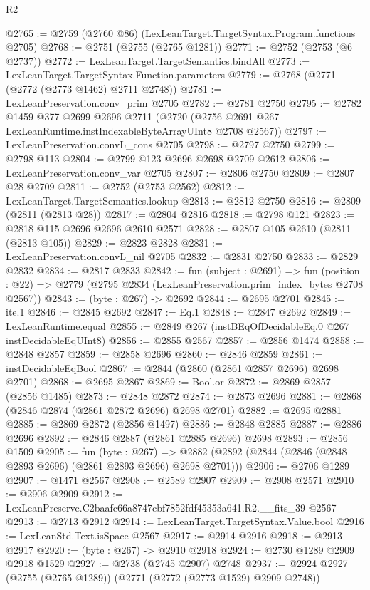 \begin{lexlean}{R2}
\begin{coremodule}
@2765 := @2759 (@2760 @86) (LexLeanTarget.TargetSyntax.Program.functions @2705)
@2768 := @2751 (@2755 (@2765 @1281))
@2771 := @2752 (@2753 (@6 @2737))
@2772 := LexLeanTarget.TargetSemantics.bindAll
@2773 := LexLeanTarget.TargetSyntax.Function.parameters
@2779 := @2768 (@2771 (@2772 (@2773 @1462) @2711 @2748))
@2781 := LexLeanPreservation.conv_prim @2705
@2782 := @2781 @2750
@2795 := @2782
    @1459
    @377
    @2699
    @2696
    @2711
    (@2720 (@2756 @2691 @267 LexLeanRuntime.instIndexableByteArrayUInt8 @2708 @2567))
@2797 := LexLeanPreservation.convL_cons @2705
@2798 := @2797 @2750
@2799 := @2798 @113
@2804 := @2799 @123 @2696 @2698 @2709 @2612
@2806 := LexLeanPreservation.conv_var @2705
@2807 := @2806 @2750
@2809 := @2807 @28 @2709
@2811 := @2752 (@2753 @2562)
@2812 := LexLeanTarget.TargetSemantics.lookup
@2813 := @2812 @2750
@2816 := @2809 (@2811 (@2813 @28))
@2817 := @2804 @2816
@2818 := @2798 @121
@2823 := @2818 @115 @2696 @2696 @2610 @2571
@2828 := @2807 @105 @2610 (@2811 (@2813 @105))
@2829 := @2823 @2828
@2831 := LexLeanPreservation.convL_nil @2705
@2832 := @2831 @2750
@2833 := @2829 @2832
@2834 := @2817 @2833
@2842 := fun (subject : @2691) =>
  fun (position : @22) => @2779 (@2795 @2834 (LexLeanPreservation.prim_index_bytes @2708 @2567))
@2843 := (byte : @267) -> @2692
@2844 := @2695 @2701
@2845 := ite.{1}
@2846 := @2845 @2692
@2847 := Eq.{1}
@2848 := @2847 @2692
@2849 := LexLeanRuntime.equal
@2855 := @2849 @267 (instBEqOfDecidableEq.{0} @267 instDecidableEqUInt8)
@2856 := @2855 @2567
@2857 := @2856 @1474
@2858 := @2848 @2857
@2859 := @2858 @2696
@2860 := @2846 @2859
@2861 := instDecidableEqBool
@2867 := @2844 (@2860 (@2861 @2857 @2696) @2698 @2701)
@2868 := @2695 @2867
@2869 := Bool.or
@2872 := @2869 @2857 (@2856 @1485)
@2873 := @2848 @2872
@2874 := @2873 @2696
@2881 := @2868 (@2846 @2874 (@2861 @2872 @2696) @2698 @2701)
@2882 := @2695 @2881
@2885 := @2869 @2872 (@2856 @1497)
@2886 := @2848 @2885
@2887 := @2886 @2696
@2892 := @2846 @2887 (@2861 @2885 @2696) @2698
@2893 := @2856 @1509
@2905 := fun (byte : @267) =>
  @2882 (@2892 (@2844 (@2846 (@2848 @2893 @2696) (@2861 @2893 @2696) @2698 @2701)))
@2906 := @2706 @1289
@2907 := @1471 @2567
@2908 := @2589 @2907
@2909 := @2908 @2571
@2910 := @2906 @2909
@2912 := LexLeanPreserve.C2baafc66a8747cbf7852fdf45353a641.R2.__fits_39 @2567
@2913 := @2713 @2912
@2914 := LexLeanTarget.TargetSyntax.Value.bool
@2916 := LexLeanStd.Text.isSpace @2567
@2917 := @2914 @2916
@2918 := @2913 @2917
@2920 := (byte : @267) -> @2910 @2918
@2924 := @2730 @1289 @2909 @2918 @1529
@2927 := @2738 (@2745 @2907) @2748
@2937 := @2924 @2927 (@2755 (@2765 @1289)) (@2771 (@2772 (@2773 @1529) @2909 @2748))

\end{coremodule}
\end{lexlean}

